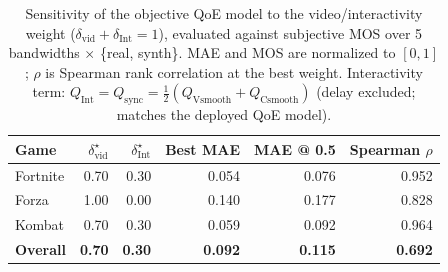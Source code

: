 \begin{table}[t]
  \centering
  \caption{Sensitivity of the objective QoE model to the video/interactivity weight ($\delta_{\mathrm{vid}}+\delta_{\mathrm{Int}}=1$), evaluated against subjective MOS over 5 bandwidths $\times$ \{real, synth\}. MAE and MOS are normalized to $[0,1]$; $\rho$ is Spearman rank correlation at the best weight. Interactivity term: $Q_{\mathrm{Int}}=Q_{\mathrm{sync}}=\tfrac12(Q_{\mathrm{Vsmooth}}+Q_{\mathrm{Csmooth}})$ (delay excluded; matches the deployed QoE model).}
  \label{tab:weight-sensitivity-delay_exclusive}
  \begin{tabular}{lrrrrr}
    \toprule
    Game & $\delta_{\mathrm{vid}}^\star$ & $\delta_{\mathrm{Int}}^\star$ & Best MAE & MAE @ 0.5 & Spearman $\rho$ \\
    \midrule
    Fortnite & 0.70 & 0.30 & 0.054 & 0.076 & 0.952 \\
    Forza & 1.00 & 0.00 & 0.140 & 0.177 & 0.828 \\
    Kombat & 0.70 & 0.30 & 0.059 & 0.092 & 0.964 \\
    \midrule
    \textbf{Overall} & \textbf{0.70} & \textbf{0.30} & \textbf{0.092} & \textbf{0.115} & \textbf{0.692} \\
    \bottomrule
  \end{tabular}
\end{table}

